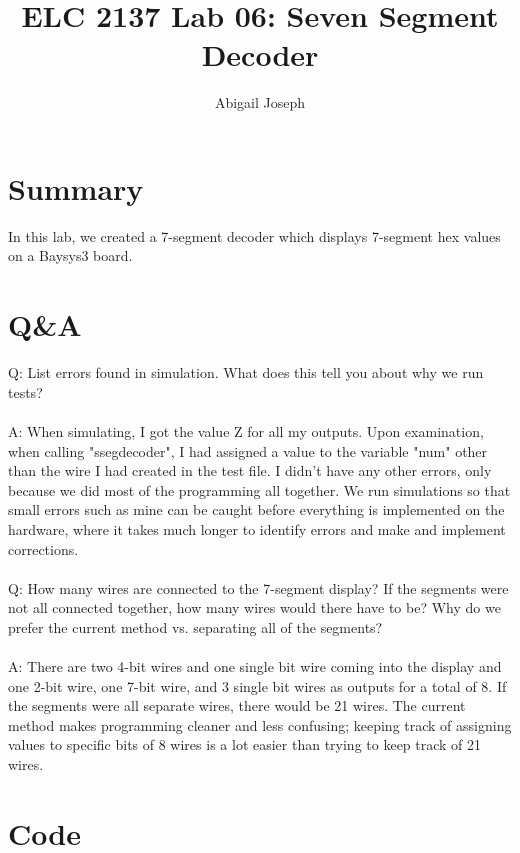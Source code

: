 \documentclass[11pt]{article}
\begin{document}
\title{ELC 2137 Lab 06: Seven Segment Decoder}
\author{Abigail Joseph}

\maketitle


\section*{Summary}

In this lab, we created a 7-segment decoder which displays 7-segment hex values on a Baysys3 board.   


\section*{Q\&A}

Q: List errors found in simulation. What does this tell you about why we run tests?\\
\\
A: When simulating, I got the value Z for all my outputs. Upon examination, when calling "ssegdecoder", I had assigned a value to the variable "num" other than the wire I had created in the test file. I didn't have any other errors, only because we did most of the programming all together. We run simulations so that small errors such as mine can be caught before everything is implemented on the hardware, where it takes much longer to identify errors and make and implement corrections.  \\
\\

Q: How many wires are connected to the 7-segment display? If the segments were not all connected together, how many wires would there have to be? Why do we prefer the current method vs. separating all of the segments? \\
\\
A: There are two 4-bit wires and one single bit wire coming into the display and one 2-bit wire, one 7-bit wire, and 3 single bit wires as outputs for a total of 8. If the segments were all separate wires, there would be 21 wires. The current method makes programming cleaner and less confusing; keeping track of assigning values to specific bits of 8 wires is a lot easier than trying to keep track of 21 wires.\\





\section*{Code}
\end{document}
